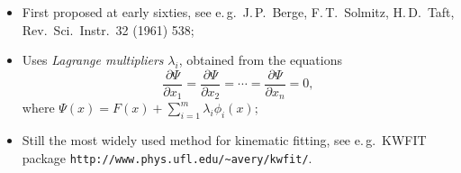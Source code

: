 
\begin{itemize}
\item First proposed at early sixties, see e.\,g.\ J.\,P.~Berge, F.\,T.~Solmitz, H.\,D.~Taft, Rev.\ Sci.\ Instr.\ 32 (1961) 538;
\item Uses \emph{Lagrange multipliers} $\lambda_i$, obtained from the equations
\[\frac{\partial\Psi}{\partial x_1} = \frac{\partial\Psi}{\partial x_2} = \cdots = \frac{\partial\Psi}{\partial x_n} = 0,\]
where $\displaystyle\Psi(x) = F(x) + \sum_{i=1}^m\lambda_i\phi_i(x);$
\item Still the most widely used method for kinematic fitting, see e.\,g.\ KWFIT package \texttt{http://www.phys.ufl.edu/\textasciitilde{}avery/kwfit/}.
\end{itemize}

